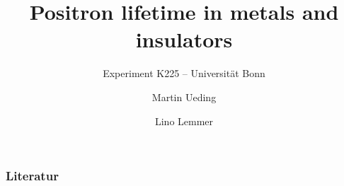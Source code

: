 \documentclass[english, fleqn]{beamer}
\title{Positron lifetime in metals and insulators}
\subtitle{Experiment K225 -- Universität Bonn}
\author{%
    Martin Ueding
    \and
    Lino Lemmer
}
\date{\daterange{2016-03-24}{2016-03-25}}
\begin{document}
\begin{frame}
    \titlepage
\end{frame}

\begin{frame}
    \frametitle{Literatur}

    \printbibliography
\end{frame}
\end{document}
